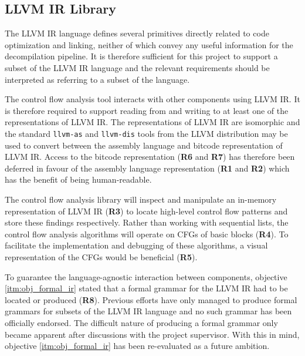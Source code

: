 
\subsection{LLVM IR Library}
\label{sec:req_llvm_ir_library}

The LLVM IR language defines several primitives directly related to code optimization and linking, neither of which convey any useful information for the decompilation pipeline. It is therefore sufficient for this project to support a subset of the LLVM IR language and the relevant requirements should be interpreted as referring to a subset of the language.

The control flow analysis tool interacts with other components using LLVM IR. It is therefore required to support reading from and writing to at least one of the representations of LLVM IR. The representations of LLVM IR are isomorphic and the standard \texttt{llvm-as} and \texttt{llvm-dis} tools from the LLVM distribution may be used to convert between the assembly language and bitcode representation of LLVM IR. Access to the bitcode representation (\textbf{R6} and \textbf{R7}) has therefore been deferred in favour of the assembly language representation (\textbf{R1} and \textbf{R2}) which has the benefit of being human-readable.

The control flow analysis library will inspect and manipulate an in-memory representation of LLVM IR (\textbf{R3}) to locate high-level control flow patterns and store these findings respectively. Rather than working with sequential lists, the control flow analysis algorithms will operate on CFGs of basic blocks (\textbf{R4}). To facilitate the implementation and debugging of these algorithms, a visual representation of the CFGs would be beneficial (\textbf{R5}).

To guarantee the language-agnostic interaction between components, objective \ref{itm:obj_formal_ir} stated that a formal grammar for the LLVM IR had to be located or produced (\textbf{R8}). Previous efforts have only managed to produce formal grammars for subsets of the LLVM IR language \cite{formal_llvm_ir_spec,formalizing_llvm_ir} and no such grammar has been officially endorsed. The difficult nature of producing a formal grammar only became apparent after discussions with the project supervisor. With this in mind, objective \ref{itm:obj_formal_ir} has been re-evaluated as a future ambition.

